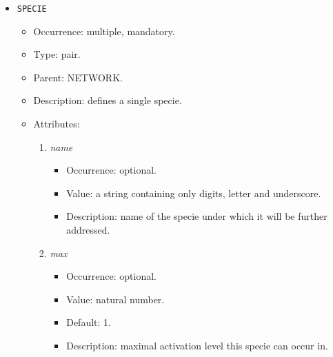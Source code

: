 \documentclass[12pt]{article}
\newenvironment{menum}{
\begin{enumerate}
  \setlength{\itemsep}{0pt}
  \setlength{\parskip}{0pt}
  \setlength{\parsep}{0pt}
}{\end{enumerate}}
\newenvironment{mitem}{
\begin{itemize}
  \setlength{\itemsep}{0pt}
  \setlength{\parskip}{0pt}
  \setlength{\parsep}{0pt}
}{\end{itemize}}
\begin{document}
\begin{mitem}
	\item \texttt{SPECIE}
	\begin{mitem}
		\item Occurrence: multiple, mandatory.
		\item Type: pair.
		\item Parent: NETWORK.
		\item Description: defines a single specie.
		\item Attributes:	
		\begin{menum}
			\item \textit{name} 
			\begin{mitem}
				\item Occurrence: optional.
				\item Value: a string containing only digits, letter and underscore.
				\item Description: name of the specie under which it will be further addressed.
			\end{mitem}
			\item \textit{max} 
			\begin{mitem}
				\item Occurrence: optional.
				\item Value: natural number.
				\item Default: 1.
				\item Description: maximal activation level this specie can occur in.
			\end{mitem}
		\end{menum}
	\end{mitem}
\end{mitem}
\end{document}
